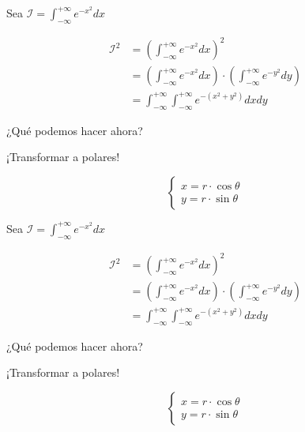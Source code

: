 \begin{frame}[fragile]
    \begin{center}
    Sea $\mathcal{I} = \int_{- \infty}^{+ \infty}{e^{-x^2}dx}$
    \end{center}
    \begin{align*}
        \mathcal{I}^2 &= \left ( \int_{- \infty}^{+ \infty}{e^{-x^2}dx} \right )^2 \\
        &= \left ( \int_{- \infty}^{+ \infty}{e^{-x^2}dx} \right ) \cdot \left ( \int_{- \infty}^{+ \infty}{e^{-y^2}dy} \right ) \\
        &= \int_{- \infty}^{+ \infty} \int_{-\infty}^{+\infty}{e^{-(x^2 + y^2)}dxdy}
    \end{align*}
    \begin{center}
    ¿Qué podemos hacer ahora?
    \end{center}

    \begin{center}
    ¡Transformar a polares!
    \end{center}
    $$
    \begin{cases}
        x = r \cdot \cos{\theta} \\
        y = r \cdot \sin{\theta}
    \end{cases}
    $$
\end{frame}

\begin{frame}[fragile]
    \begin{center}
    Sea $\mathcal{I} = \int_{- \infty}^{+ \infty}{e^{-x^2}dx}$
    \end{center}
    \begin{align*}
        \mathcal{I}^2 &= \left ( \int_{- \infty}^{+ \infty}{e^{-x^2}dx} \right )^2 \\
        &= \left ( \int_{- \infty}^{+ \infty}{e^{-x^2}dx} \right ) \cdot \left ( \int_{- \infty}^{+ \infty}{e^{-y^2}dy} \right ) \\
        &= \int_{- \infty}^{+ \infty} \int_{-\infty}^{+\infty}{e^{-(x^2 + y^2)}dxdy}
    \end{align*}
    \begin{center}
    ¿Qué podemos hacer ahora?
    \end{center}
    \begin{center}
    ¡Transformar a polares!
    \end{center}
    $$
    \begin{cases}
        x = r \cdot \cos{\theta} \\
        y = r \cdot \sin{\theta}
    \end{cases}
    $$
\end{frame}

